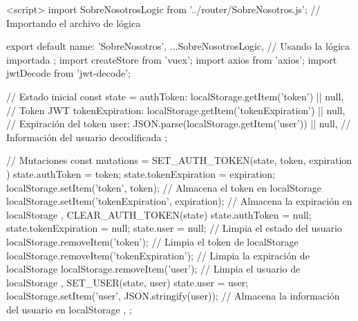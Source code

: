 
<script>
import SobreNosotrosLogic from '../router/SobreNosotros.js'; // Importando el archivo de lógica

export default {
  name: 'SobreNosotros',
  ...SobreNosotrosLogic, // Usando la lógica importada
};
import { createStore } from 'vuex';
import axios from 'axios';
import { jwtDecode } from 'jwt-decode';

// Estado inicial
const state = {
  authToken: localStorage.getItem('token') || null, // Token JWT
  tokenExpiration: localStorage.getItem('tokenExpiration') || null, // Expiración del token
  user: JSON.parse(localStorage.getItem('user')) || null, // Información del usuario decodificada
};

// Mutaciones
const mutations = {
  SET_AUTH_TOKEN(state, { token, expiration }) {
    state.authToken = token;
    state.tokenExpiration = expiration;
    localStorage.setItem('token', token); // Almacena el token en localStorage
    localStorage.setItem('tokenExpiration', expiration); // Almacena la expiración en localStorage
  },
  CLEAR_AUTH_TOKEN(state) {
    state.authToken = null;
    state.tokenExpiration = null;
    state.user = null; // Limpia el estado del usuario
    localStorage.removeItem('token'); // Limpia el token de localStorage
    localStorage.removeItem('tokenExpiration'); // Limpia la expiración de localStorage
    localStorage.removeItem('user'); // Limpia el usuario de localStorage
  },
  SET_USER(state, user) {
    state.user = user;
    localStorage.setItem('user', JSON.stringify(user)); // Almacena la información del usuario en localStorage
  },
};

